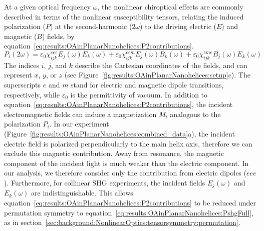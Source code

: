At a given optical frequency $\omega$, the nonlinear chiroptical effects are commonly described in terms of the nonlinear susceptibility tensors, relating the induced polarization ($P$) at the second-harmonic ($2\omega$) to the driving electric ($E$) and magnetic ($B$) fields, by equation~\ref{eq:results:OAinPlanarNanohelices:P2contributions}.\cite{Boyd2008a}
\begin{equation}\label{eq:results:OAinPlanarNanohelices:P2contributions}	
    {P_i}\left( {2\omega } \right) = 
    \varepsilon{_0}\chi_{ijk}^{eee}{E_j}\left(\omega \right){E_k}\left(\omega \right) + \varepsilon{_0}\chi_{ijk}^{eem}{E_j}\left(\omega \right){B_k}\left(\omega \right) + \varepsilon{_0}\chi_{ijk}^{eme}{B_j}\left(\omega \right){E_k}\left(\omega \right)
\end{equation}
The indices $i$, $j$, and $k$ describe the Cartesian coordinates of the fields, and can represent $x$, $y$, or $z$ (see Figure~\ref{fig:results:OAinPlanarNanohelices:setup}c). 
The superscripts $e$ and $m$ stand for electric and magnetic dipole transitions, respectively, while $\varepsilon{_0}$ is the permittivity of vacuum. 
In addition to equation~\ref{eq:results:OAinPlanarNanohelices:P2contributions}, the incident electromagnetic fields can induce a magnetization $M_i$ analogous to the polarization $P_i$. 
In our experiment (Figure~\ref{fig:results:OAinPlanarNanohelices:combined_data}a), the incident electric field is polarized perpendicularly to the main helix axis, therefore we can exclude this magnetic contribution. Away from resonance, the magnetic component of the incident light is much weaker than the electric component. 
In our analysis, we therefore consider only the contribution from electric dipoles ($eee$). Furthermore, for collinear SHG experiments, the incident fields ${E_j}(\omega)$ and ${E_k}(\omega)$ are indistinguishable. This allows equation~\ref{eq:results:OAinPlanarNanohelices:P2contributions} to be reduced under permutation symmetry to equation~\ref{eq:results:OAinPlanarNanohelices:PshgFull}, as in section~\ref{sec:background:NonlinearOptics:tensorsymmetry:permutation}.

